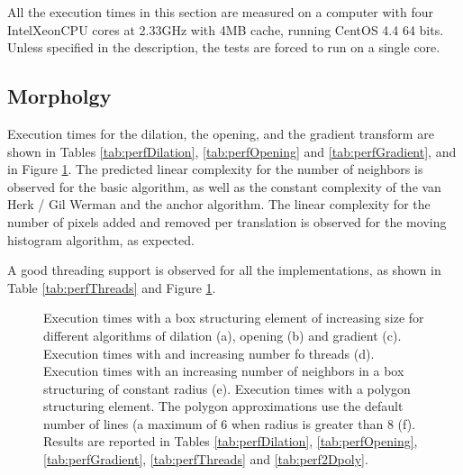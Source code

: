 \documentclass[a4paper]{InsightArticle}
\begin{document}
All the execution times in this section are measured on a computer with four
Intel\textregistered Xeon\textregistered CPU cores at 2.33GHz with 4MB cache,
running CentOS 4.4 64 bits. Unless specified in the description, the tests are
forced to run on a single core.

\subsection{Morpholgy}

Execution times for the dilation, the opening, and the gradient transform are shown in
Tables \ref{tab:perfDilation}, \ref{tab:perfOpening} and \ref{tab:perfGradient}, and in
Figure \ref{fig:consolidatedMorphology-perf}. The predicted linear complexity for the number
of neighbors is observed for the basic algorithm, as well as the constant complexity of the
van Herk / Gil Werman and the anchor algorithm. The linear complexity for the number of
pixels added and removed per translation is observed for the moving histogram algorithm,
as expected.

A good threading support is observed for all the implementations, as shown in Table
\ref{tab:perfThreads} and Figure \ref{fig:consolidatedMorphology-perf}.

\begin{figure}[htbp]
\begin{center}
\caption{Execution times with a box structuring element of increasing size for different algorithms of dilation (a),
opening (b) and gradient (c).
Execution times with and increasing number fo threads (d).
Execution times with an increasing number of neighbors in a box structuring of constant radius (e).
Execution times with a polygon structuring element. The polygon approximations use the default number of lines (a maximum of 6 when radius is greater than 8 (f).\label{fig:consolidatedMorphology-perf}
Results are reported in Tables \ref{tab:perfDilation}, \ref{tab:perfOpening}, \ref{tab:perfGradient},
\ref{tab:perfThreads} and \ref{tab:perf2Dpoly}.
}
\end{center}
\end{figure}
\end{document}
